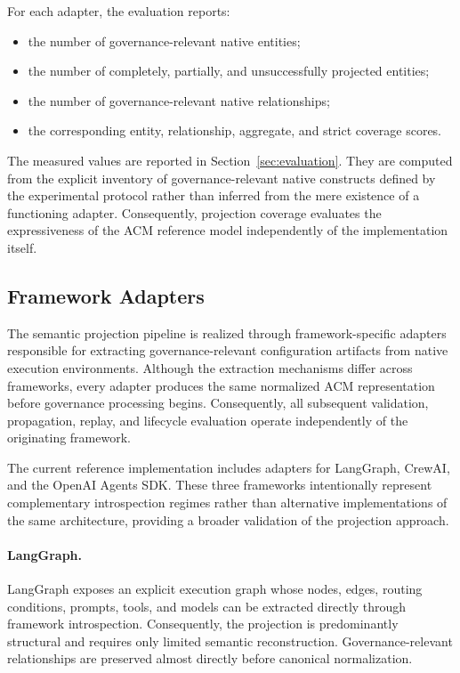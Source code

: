 \documentclass[10pt]{article}
\begin{document}
For each adapter, the evaluation reports:

\begin{itemize}
	\item the number of governance-relevant native entities;
	\item the number of completely, partially, and unsuccessfully projected entities;
	\item the number of governance-relevant native relationships;
	\item the corresponding entity, relationship, aggregate, and strict coverage scores.
\end{itemize}

The measured values are reported in Section~\ref{sec:evaluation}. They are computed from the explicit inventory of governance-relevant native constructs defined by the experimental protocol rather than inferred from the mere existence of a functioning adapter. Consequently, projection coverage evaluates the expressiveness of the ACM reference model independently of the implementation itself.


\subsection{Framework Adapters}
\label{sec:framework_adapters}

The semantic projection pipeline is realized through framework-specific adapters responsible for extracting governance-relevant configuration artifacts from native execution environments. Although the extraction mechanisms differ across frameworks, every adapter produces the same normalized ACM representation before governance processing begins. Consequently, all subsequent validation, propagation, replay, and lifecycle evaluation operate independently of the originating framework.

The current reference implementation includes adapters for LangGraph, CrewAI, and the OpenAI Agents SDK. These three frameworks intentionally represent complementary introspection regimes rather than alternative implementations of the same architecture, providing a broader validation of the projection approach.

\paragraph{LangGraph.}

LangGraph exposes an explicit execution graph whose nodes, edges, routing conditions, prompts, tools, and models can be extracted directly through framework introspection. Consequently, the projection is predominantly structural and requires only limited semantic reconstruction. Governance-relevant relationships are preserved almost directly before canonical normalization.
\end{document}
